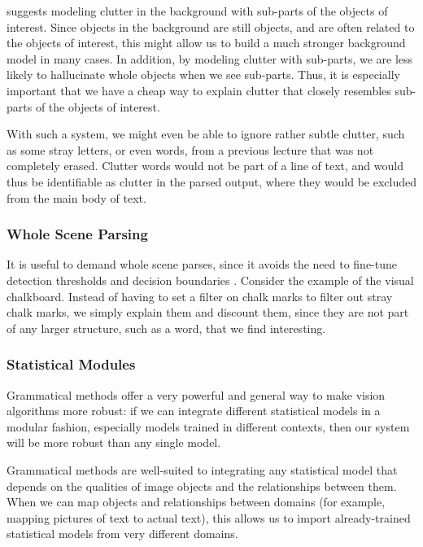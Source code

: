 \documentclass{article}
\begin{document}
\cite{jin-geman} suggests modeling clutter in the background with
sub-parts of the objects of interest. Since objects in the background
are still objects, and are often related to the objects of interest,
this might allow us to build a much stronger background model in many
cases. In addition, by modeling clutter with sub-parts, we are less
likely to hallucinate whole objects when we see sub-parts. Thus, it is
especially important that we have a cheap way to explain clutter that
closely resembles sub-parts of the objects of interest.

With such a system, we might even be able to ignore rather subtle
clutter, such as some stray letters, or even words, from a previous
lecture that was not completely erased. Clutter words would not be
part of a line of text, and would thus be identifiable as clutter in
the parsed output, where they would be excluded from the main body of
text.

\subsubsection{Whole Scene Parsing}
\label{sec-whole}

It is useful to demand whole scene parses, since it avoids the need to
fine-tune detection thresholds and decision boundaries
\cite{pop}. Consider the example of the visual chalkboard. Instead of
having to set a filter on chalk marks to filter out stray chalk marks,
we simply explain them and discount them, since they are not part of
any larger structure, such as a word, that we find interesting.

\subsubsection{Statistical Modules}
\label{sec-modules}

Grammatical methods offer a very powerful and general way to make
vision algorithms more robust: if we can integrate different
statistical models in a modular fashion, especially models trained in
different contexts, then our system will be more robust than any
single model.

Grammatical methods are well-suited to integrating any statistical
model that depends on the qualities of image objects and the
relationships between them. When we can map objects and relationships
between domains (for example, mapping pictures of text to actual
text), this allows us to import already-trained statistical models
from very different domains.
\end{document}
